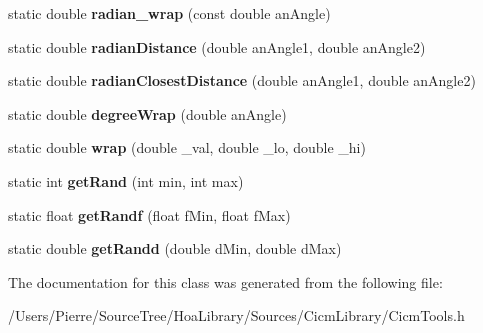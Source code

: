 \begin{DoxyCompactItemize}
\item 
\hypertarget{class_tools_a6d98b24e13dbfd1e9ce7c98d3df7d5f3}{static double {\bfseries radian\-\_\-wrap} (const double an\-Angle)}\label{class_tools_a6d98b24e13dbfd1e9ce7c98d3df7d5f3}

\item 
\hypertarget{class_tools_aa698b9d5ff416a3eb1a94ccc549b86c1}{static double {\bfseries radian\-Distance} (double an\-Angle1, double an\-Angle2)}\label{class_tools_aa698b9d5ff416a3eb1a94ccc549b86c1}

\item 
\hypertarget{class_tools_a983dfec741d6bbf8acea2ba57b80c2d7}{static double {\bfseries radian\-Closest\-Distance} (double an\-Angle1, double an\-Angle2)}\label{class_tools_a983dfec741d6bbf8acea2ba57b80c2d7}

\item 
\hypertarget{class_tools_ab1bd848045eb791be59d7736fcb8ee92}{static double {\bfseries degree\-Wrap} (double an\-Angle)}\label{class_tools_ab1bd848045eb791be59d7736fcb8ee92}

\item 
\hypertarget{class_tools_ab480a7e5898049a68dd16474fd1744d5}{static double {\bfseries wrap} (double \-\_\-val, double \-\_\-lo, double \-\_\-hi)}\label{class_tools_ab480a7e5898049a68dd16474fd1744d5}

\item 
\hypertarget{class_tools_a2330eb5e6bbda3c85674c6de0561385f}{static int {\bfseries get\-Rand} (int min, int max)}\label{class_tools_a2330eb5e6bbda3c85674c6de0561385f}

\item 
\hypertarget{class_tools_a4ef0d4f226042f9f3505da3057f19a8a}{static float {\bfseries get\-Randf} (float f\-Min, float f\-Max)}\label{class_tools_a4ef0d4f226042f9f3505da3057f19a8a}

\item 
\hypertarget{class_tools_a3783b2bfed4d48cb3496c49172b1efbc}{static double {\bfseries get\-Randd} (double d\-Min, double d\-Max)}\label{class_tools_a3783b2bfed4d48cb3496c49172b1efbc}

\end{DoxyCompactItemize}


The documentation for this class was generated from the following file\-:\begin{DoxyCompactItemize}
\item 
/\-Users/\-Pierre/\-Source\-Tree/\-Hoa\-Library/\-Sources/\-Cicm\-Library/Cicm\-Tools.\-h\end{DoxyCompactItemize}
